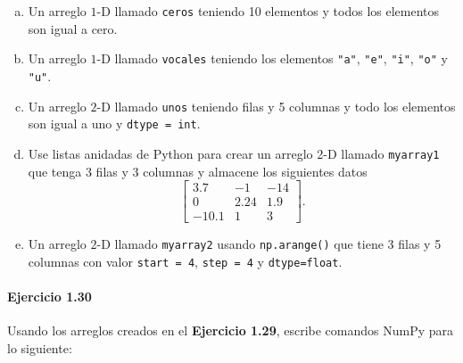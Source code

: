 \begin{enumerate}[(a)]
	\item

	      Un arreglo $1$-D llamado \texttt{ceros} teniendo
	      10 elementos y todos los elementos son igual a cero.

	\item

	      Un arreglo $1$-D llamado \texttt{vocales}
	      teniendo los elementos \texttt{"a"},
	      \texttt{"e"}, \texttt{"i"},
	      \texttt{"o"} y \texttt{"u"}.

	\item

	      Un arreglo $2$-D llamado \texttt{unos} teniendo
	      filas y 5 columnas y todo los elementos son igual a uno y
	      \texttt{dtype = int}.

	\item

	      Use listas anidadas de Python para crear un arreglo 2-D
	      llamado \texttt{myarray1} que tenga 3 filas y 3
	      columnas y almacene los siguientes datos
	      \begin{equation*}
		      \begin{bmatrix}
			      3.7   & -1   & -14 \\
			      0     & 2.24 & 1.9 \\
			      -10.1 & 1    & 3
		      \end{bmatrix}.
	      \end{equation*}

	\item

	      Un arreglo $2$-D llamado \texttt{myarray2} usando
	      \texttt{np.arange()} que tiene 3 filas y 5
	      columnas con valor \texttt{start = 4},
	      \texttt{step = 4} y
	      \texttt{dtype=float}.
\end{enumerate}

\paragraph{\color{DarkBlue}Ejercicio 1.30}
Usando los arreglos creados en el \textbf{Ejercicio 1.29},
escribe comandos NumPy para lo siguiente:

